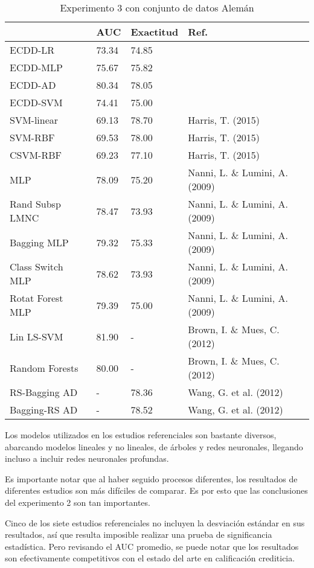 \begin{table}[htbp]
\centering
\caption{Experimento 3 con conjunto de datos Alemán}
\label{tab:german-proc3}
\begin{tabularx}{\textwidth}{|l|Y Y l|}
						\hline
						& AUC		& Exactitud	& Ref.									\\
						\hline
ECDD-LR					& 73.34		& 74.85		&										\\		%
ECDD-MLP				& 75.67		& 75.82		&										\\		%
ECDD-AD					& 80.34		& 78.05		&										\\		%
ECDD-SVM				& 74.41		& 75.00		&										\\		%
						\hline
SVM-linear				& 69.13		& 78.70		& Harris, T. (2015)						\\		%
SVM-RBF					& 69.53		& 78.00		& Harris, T. (2015)						\\		%
CSVM-RBF				& 69.23		& 77.10		& Harris, T. (2015)						\\		%
MLP						& 78.09		& 75.20		& Nanni, L. \& Lumini, A. (2009)		\\		%
Rand Subsp LMNC			& 78.47		& 73.93		& Nanni, L. \& Lumini, A. (2009)		\\		%
Bagging MLP				& 79.32		& 75.33		& Nanni, L. \& Lumini, A. (2009)		\\		%
Class Switch MLP		& 78.62		& 73.93		& Nanni, L. \& Lumini, A. (2009)		\\		%
Rotat Forest MLP		& 79.39		& 75.00		& Nanni, L. \& Lumini, A. (2009)		\\		%
Lin LS-SVM				& 81.90		& -			& Brown, I. \& Mues, C. (2012)			\\		%
Random Forests			& 80.00		& -			& Brown, I. \& Mues, C. (2012)			\\		%
RS-Bagging AD			& -			& 78.36		& Wang, G. et al. (2012)				\\		%
Bagging-RS AD			& -			& 78.52		& Wang, G. et al. (2012)				\\		%
						\hline
\end{tabularx}
\par
\end{table}


Los modelos utilizados en los estudios referenciales son bastante diversos, abarcando modelos lineales y no lineales, de árboles y redes neuronales, llegando incluso a incluir redes neuronales profundas.

Es importante notar que al haber seguido procesos diferentes, los resultados de diferentes estudios son más difíciles de comparar. Es por esto que las conclusiones del experimento 2 son tan importantes.

Cinco de los siete estudios referenciales no incluyen la desviación estándar en sus resultados, así que resulta imposible realizar una prueba de significancia estadística. Pero revisando el \ac{AUC} promedio, se puede notar que los resultados son efectivamente competitivos con el estado del arte en calificación crediticia.


